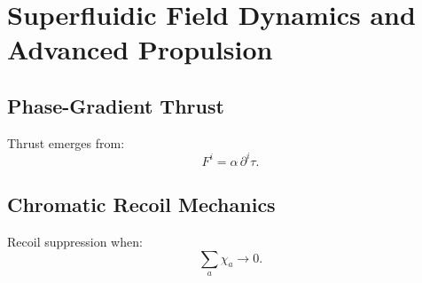 \chapter{Superfluidic Field Dynamics and Advanced Propulsion}

\section{Phase-Gradient Thrust}
Thrust emerges from:
\[
F^i = \alpha\, \partial^i \tau.
\]

\section{Chromatic Recoil Mechanics}
Recoil suppression when:
\[
\sum_a \chi_a \to 0.
\]

